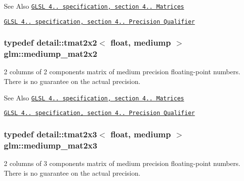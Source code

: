 \begin{DoxySeeAlso}{See Also}
\href{http://www.opengl.org/registry/doc/GLSLangSpec.4.20.8.pdf}{\tt G\-L\-S\-L 4.. specification, section 4.. Matrices} 

\href{http://www.opengl.org/registry/doc/GLSLangSpec.4.20.8.pdf}{\tt G\-L\-S\-L 4.. specification, section 4.. Precision Qualifier} 
\end{DoxySeeAlso}
\hypertarget{group__core__precision_ga867b486aea2d228a1e1a134af73b2c4b}{
\subsubsection[{mediump\-\_\-mat2x2}]{\setlength{\rightskip}{0pt plus 5cm}typedef detail\-::tmat2x2$<$ float, mediump $>$ {\bf glm\-::mediump\-\_\-mat2x2}}}\label{group__core__precision_ga867b486aea2d228a1e1a134af73b2c4b}
2 columns of 2 components matrix of medium precision floating-\/point numbers. There is no guarantee on the actual precision.

\begin{DoxySeeAlso}{See Also}
\href{http://www.opengl.org/registry/doc/GLSLangSpec.4.20.8.pdf}{\tt G\-L\-S\-L 4.. specification, section 4.. Matrices} 

\href{http://www.opengl.org/registry/doc/GLSLangSpec.4.20.8.pdf}{\tt G\-L\-S\-L 4.. specification, section 4.. Precision Qualifier} 
\end{DoxySeeAlso}
\hypertarget{group__core__precision_gad4e099c0dfa8f35ce9c0ddc8605428cf}{
\subsubsection[{mediump\-\_\-mat2x3}]{\setlength{\rightskip}{0pt plus 5cm}typedef detail\-::tmat2x3$<$ float, mediump $>$ {\bf glm\-::mediump\-\_\-mat2x3}}}\label{group__core__precision_gad4e099c0dfa8f35ce9c0ddc8605428cf}
2 columns of 3 components matrix of medium precision floating-\/point numbers. There is no guarantee on the actual precision.

